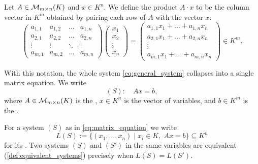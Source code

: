 \begin{definition}
\label{def:matrix_vector_multiplication}
Let $A \in \mathcal{M}_{m \times n}(K)$ and $x \in K^n$. We define the product $A \cdot x$ to be the column vector in $K^m$ obtained by pairing each row of $A$ with the vector $x$:
\[
\begin{pmatrix}
a_{1,1} & a_{1,2} & \dots & a_{1,n} \\
a_{2,1} & a_{2,2} & \dots & a_{2,n} \\
\vdots & \vdots & \ddots & \vdots \\
a_{m,1} & a_{m,2} & \dots & a_{m,n}
\end{pmatrix}
\begin{pmatrix} x_1 \\ x_2 \\ \vdots \\ x_n \end{pmatrix}
=
\begin{pmatrix}
a_{1,1}x_1 + \dots + a_{1,n}x_n \\
a_{2,1}x_1 + \dots + a_{2,n}x_n \\
\vdots \\
a_{m,1}x_1 + \dots + a_{m,n}x_n
\end{pmatrix} \in K^m.
\]
\end{definition}

With this notation, the whole system \eqref{eq:general_system} collapses into a single matrix equation. We write
\begin{equation} \label{eq:matrix_equation}
(S): \quad A x = b,
\end{equation}
where $A \in \mathcal{M}_{m \times n}(K)$ is the , $x \in K^n$ is the vector of variables, and $b \in K^m$ is the .

\begin{notation}
\label{not:solution_set}
For a system $(S)$ as in \eqref{eq:matrix_equation} we write
\[
L(S) := \{(x_1, \dots, x_n) \mid x_i \in K, \; A x = b\} \subseteq K^n
\]
for its . Two systems $(S)$ and $(S')$ in the same variables are equivalent (\cref{def:equivalent_systems}) precisely when $L(S) = L(S')$.
\end{notation}

